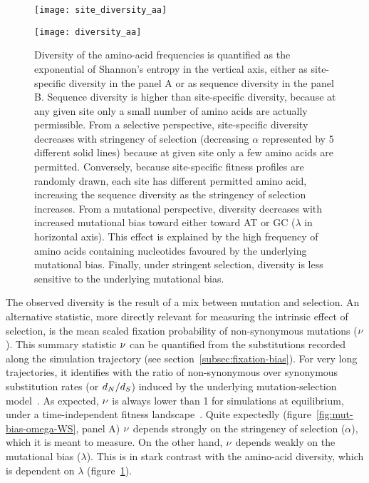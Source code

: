 \begin{figure}[htbp]
    \centering
    \begin{minipage}{0.49\linewidth}
        \texttt{[image: site\_diversity\_aa]}
    \end{minipage}
    \hfill
    \begin{minipage}{0.49\linewidth}
        \texttt{[image: diversity\_aa]}
    \end{minipage}
    \hfill
    \caption[Diversity of amino acids]{
    Diversity of the amino-acid frequencies is quantified as the exponential of Shannon's entropy in the vertical axis, either as site-specific diversity in the panel A or as sequence diversity in the panel B.
    Sequence diversity is higher than site-specific diversity, because at any given site only a small number of amino acids are actually permissible.
    From a selective perspective, site-specific diversity decreases with stringency of selection (decreasing $\alpha$ represented by 5 different solid lines) because at given site only a few amino acids are permitted.
    Conversely, because site-specific fitness profiles are randomly drawn, each site has different permitted amino acid, increasing the sequence diversity as the stringency of selection increases.
    From a mutational perspective, diversity decreases with increased mutational bias toward either toward AT or GC ($\lambda$ in horizontal axis).
    This effect is explained by the high frequency of amino acids containing nucleotides favoured by the underlying mutational bias.
    Finally, under stringent selection, diversity is less sensitive to the underlying mutational bias.}
    \label{fig:mut-bias-diversity-aa}
\end{figure}

The observed diversity is the result of a mix between mutation and selection.
An alternative statistic, more directly relevant for measuring the intrinsic effect of selection, is the mean scaled fixation probability of non-synonymous mutations ($\nu$).
This summary statistic $\nu$ can be quantified from the substitutions recorded along the simulation trajectory (see section~\ref{subsec:fixation-bias}).
For very long trajectories, it identifies with the ratio of non-synonymous over synonymous substitution rates (or $d_N / d_S$) induced by the underlying mutation-selection model~\citep{Spielman2015, DosReis2015, Jones2016}.
As expected, $\nu$ is always lower than 1 for simulations at equilibrium, under a time-independent fitness landscape~\citep{Spielman2015}.
Quite expectedly (figure~\ref{fig:mut-bias-omega-WS}, panel A) $\nu$ depends strongly on the stringency of selection ($\alpha$), which it is meant to measure.
On the other hand, $\nu$ depends weakly on the mutational bias ($\lambda$).
This is in stark contrast with the amino-acid diversity, which is dependent on $\lambda$ (figure~\ref{fig:mut-bias-diversity-aa}).

